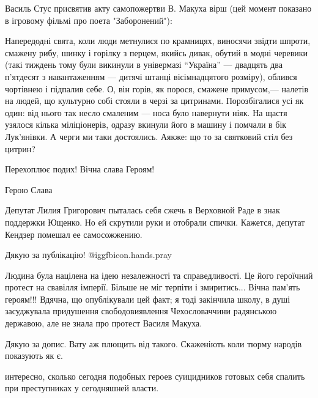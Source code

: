 \begin{itemize}
Василь Стус присвятив акту самопожертви В. Макуха вірш (цей момент показано в
ігровому фільмі про поета "Заборонений"):

\obeycr
Напередодні свята,
коли люди метнулися по крамницях,
виносячи звідти шпроти, смажену рибу,
шинку і горілку з перцем,
якийсь дивак, обутий в модні черевики
(такі тиждень тому були викинули
в універмазі \enquote{Україна} — двадцять два
п’ятдесят з навантаженням — дитячі штанці
вісімнадцятого розміру), облився чортівнею
і підпалив себе.
О, він горів, як порося, смажене примусом,—
налетів на людей, що культурно собі стояли
в черзі за цитринами.
Порозбігалися усі як один:
від нього так несло смаленим —
носа було навернути ніяк.
На щастя узялося кілька міліціонерів,
одразу вкинули його в машину
і помчали в бік Лук’янівки.
А черги ми таки достоялись. Аякже:
що то за святковий стіл без цитрин?
\restorecr

Перехоплює подих! Вічна слава Героям!

Герою Слава


Депутат Лилия Григорович пыталась себя сжечь в Верховной Раде в знак поддержки
Ющенко. Но ей скрутили руки и отобрали спички. Кажется, депутат Кендзер помешал
ее самосожжению.

Дякую за публікацію!  @igg{fbicon.hands.pray} 


Людина була націлена на ідею незалежності та справедливості. Це його героїчний
протест на свавілля імперії. Більше не міг терпіти і змиритись... Вічна пам'ять
героям!!! Вдячна, що опублікували цей факт; я тоді закінчила школу, в душі
засуджувала придушення свободовиявлення Чехословаччини радянською державою, але
не знала про протест Василя Макуха.


Дякую за допис. Вату аж плющить від такого. Скаженіють коли тюрму народів
показують як є.


интересно, сколько сегодня подобных героев суицидников готовых себя спалить при
преступниках у сегодняшней власти.

\end{itemize} %
